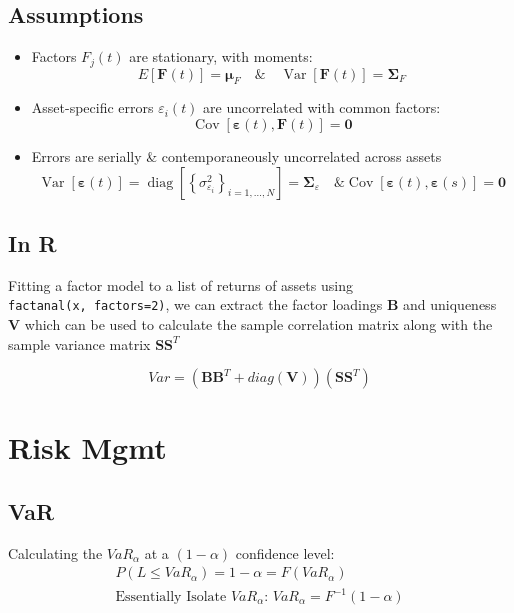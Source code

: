 \documentclass[
  oneside]{book}
\providecommand{\tightlist}{%
  \setlength{\itemsep}{0pt}\setlength{\parskip}{0pt}}
\begin{document}
\hypertarget{assumptions-1}{%
\subsection{Assumptions}\label{assumptions-1}}

\begin{itemize}
\tightlist
\item
  Factors \(F_j(t)\) are stationary, with moments:
  \[
  E[\mathbf{F}(t)]=\boldsymbol{\mu}_F \quad \& \quad \operatorname{Var}[\mathbf{F}(t)]=\boldsymbol{\Sigma}_F
  \]
\item
  Asset-specific errors \(\varepsilon_i(t)\) are uncorrelated with common factors:
  \[
  \operatorname{Cov}[\mathbf{\varepsilon}(t), \mathbf{F}(t)]=\mathbf{0}
  \]
\item
  Errors are serially \& contemporaneously uncorrelated across assets
  \[
  \operatorname{Var}[\boldsymbol{\varepsilon}(t)]=\operatorname{diag}\left[\left\{\sigma_{\varepsilon_i}^2\right\}_{i=1, \ldots, N}\right]=\boldsymbol{\Sigma}_{\varepsilon} \quad \& \operatorname{Cov}[\boldsymbol{\varepsilon}(t), \boldsymbol{\varepsilon}(s)]=\mathbf{0}
  \]
\end{itemize}

\hypertarget{in-r}{%
\subsection{In R}\label{in-r}}

Fitting a factor model to a list of returns of assets using \texttt{factanal(x,\ factors=2)}, we can extract the factor loadings \(\mathbf{B}\) and uniqueness \(\mathbf{V}\) which can be used to calculate the sample correlation matrix along with the sample variance matrix \(\mathbf{SS}^{T}\)

\[
Var = (\mathbf{B}\mathbf{B}^{T}+diag(\mathbf{V}) ) (\mathbf{SS}^{T})
\]

\hypertarget{risk-mgmt}{%
\section{Risk Mgmt}\label{risk-mgmt}}

\hypertarget{var}{%
\subsection{VaR}\label{var}}

Calculating the \(VaR_{\alpha}\) at a \((1-\alpha)\) confidence level:
\[
\begin{gathered}
P(L\leq VaR_{\alpha}) = 1-\alpha = F(VaR_{\alpha})\\
\text{Essentially Isolate $VaR_{\alpha}$: } VaR_{\alpha} = F^{-1}(1-\alpha)
\end{gathered}
\]
\end{document}
